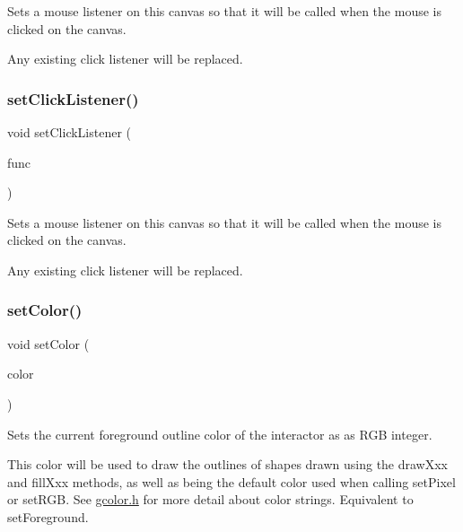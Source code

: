 Sets a mouse listener on this canvas so that it will be called when the mouse is clicked on the canvas. 

Any existing click listener will be replaced. \mbox{\label{classGCanvas_a856414c92df90f56f3877475eb3f8fc4}} 
\subsubsection{\texorpdfstring{set\+Click\+Listener()}{setClickListener()}\hspace{0.1cm}{\footnotesize\ttfamily [2/2]}}
{\footnotesize\ttfamily void set\+Click\+Listener (\begin{DoxyParamCaption}\item[{G\+Event\+Listener\+Void}]{func }\end{DoxyParamCaption})\hspace{0.3cm}{\ttfamily [virtual]}}



Sets a mouse listener on this canvas so that it will be called when the mouse is clicked on the canvas. 

Any existing click listener will be replaced. \mbox{\label{classGCanvas_a292eb0ce61f3fdb1d28b17e1e34928f7}} 
\subsubsection{\texorpdfstring{set\+Color()}{setColor()}\hspace{0.1cm}{\footnotesize\ttfamily [1/2]}}
{\footnotesize\ttfamily void set\+Color (\begin{DoxyParamCaption}\item[{int}]{color }\end{DoxyParamCaption})\hspace{0.3cm}{\ttfamily [virtual]}}



Sets the current foreground outline color of the interactor as as R\+GB integer. 

This color will be used to draw the outlines of shapes drawn using the draw\+Xxx and fill\+Xxx methods, as well as being the default color used when calling set\+Pixel or set\+R\+GB. See \mbox{\hyperlink{gcolor_8h_source}{gcolor.\+h}} for more detail about color strings. Equivalent to set\+Foreground. 

